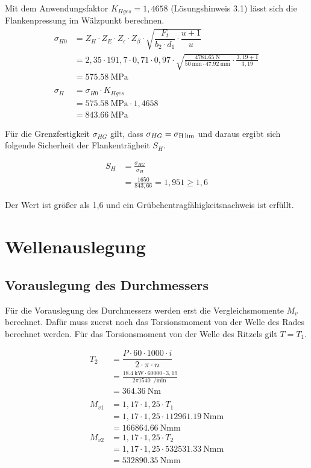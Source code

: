 \documentclass[15pt,a4paper]{article}
\begin{document}
     
     Mit dem Anwendungsfaktor $K_{Hges} = 1,4658$ (Lösungshinweis 3.1) lässt sich die Flankenpressung im Wälzpunkt berechnen.
     \begin{align*}
     	\sigma_{H0}&=Z_H \cdot Z_E \cdot Z_\epsilon \cdot Z_\beta \cdot \sqrt{\dfrac{F_t}{b_2 \cdot d_1}\cdot \dfrac{u+1}{u}}  \tag{21.88}\\
     	&= 2,35\cdot191,7\cdot0,71\cdot0,97\cdot \sqrt{\frac{\SI{4784,65}{\newton}}{\SI{50}{\milli\m}\cdot\SI{47,92}{\milli\m}} \cdot \frac{3,19+1}{3,19}}\\
     	&=\SI{575,58}{\mega\pascal}\\
     	\\
     	\sigma_{H} &= \sigma_{H0} \cdot K_{Hges} \tag{21.89}\\
     	&= \SI{575,58}{\mega\pascal} \cdot 1,4658\\
     	&= \SI{843,66}{\mega\pascal}
     \end{align*}
     
     
     Für die Grenzfestigkeit $\sigma_{HG}$ gilt, dass $\sigma_{HG}=\sigma_{\rm H\, lim}$ und daraus ergibt sich folgende Sicherheit der Flankenträgheit $S_H$.
     
     \begin{align*}
     	S_H&=\frac{\sigma_{HG}}{\sigma_{H}} \tag{21.90a}\\
     	&=\frac{1650}{843,66}=1,951 \geq 1,6
     \end{align*}
     
     Der Wert ist größer als 1,6 und ein Grübchentragfähigkeitsnachweis ist erfüllt. 
     
     \section{Wellenauslegung}
     \subsection{Vorauslegung des Durchmessers}
     Für die Vorauslegung des Durchmessers werden erst die Vergleichsmomente $M_v$ berechnet. Dafür muss zuerst noch das Torsionsmoment von der Welle des Rades berechnet werden. Für das Torsionsmoment von der Welle des Ritzels gilt $T=T_1$.
     
     \begin{align*}
     	T_2&=\dfrac{P \cdot 60 \cdot 1000 \cdot i}{2 \cdot \pi \cdot n}\\
     	&=\frac{\SI{18,4}{\kilo\watt}\cdot 60000 \cdot 3,19 }{2\pi \SI{1540}{\per\min}}\\
     	&=\SI{364,36}{\newton\m}\\\\
     	M_{v1}&=1,17 \cdot 1,25 \cdot T_1\tag{11.14} \\
     	&= 1,17 \cdot 1,25 \cdot \SI{112961,19}{\newton\milli\metre} \\
     	&=\SI{166864,66}{\newton\milli\m} \\
     	M_{v2}&=1,17 \cdot 1,25 \cdot T_2 \\
     	&=     	1,17 \cdot 1,25 \cdot \SI{532531,33}{\newton\milli\m} \\
     	&=\SI{532890,35}{\newton\milli\m}
     \end{align*}
     
\end{document}
